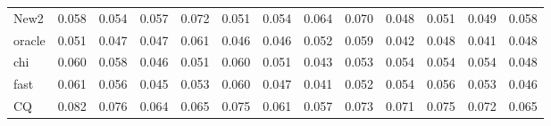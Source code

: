 \documentclass[review]{elsarticle}
\theoremstyle{plain}
\theoremstyle{definition}
\theoremstyle{remark}
\begin{document}
\begin{table}[ht]
\begin{tabular}{lllllllllllll}
New2 & 0.058 & 0.054 & 0.057 & 0.072 & 0.051 & 0.054 & 0.064 & 0.070 & 0.048 & 0.051 & 0.049 & 0.058 \\ 
oracle & 0.051 & 0.047 & 0.047 & 0.061 & 0.046 & 0.046 & 0.052 & 0.059 & 0.042 & 0.048 & 0.041 & 0.048 \\ 
chi & 0.060 & 0.058 & 0.046 & 0.051 & 0.060 & 0.051 & 0.043 & 0.053 & 0.054 & 0.054 & 0.054 & 0.048 \\ 
fast & 0.061 & 0.056 & 0.045 & 0.053 & 0.060 & 0.047 & 0.041 & 0.052 & 0.054 & 0.056 & 0.053 & 0.046 \\ 
CQ & 0.082 & 0.076 & 0.064 & 0.065 & 0.075 & 0.061 & 0.057 & 0.073 & 0.071 & 0.075 & 0.072 & 0.065 \\ 
\bottomrule
\end{tabular}
\end{table}


%
\end{document}
